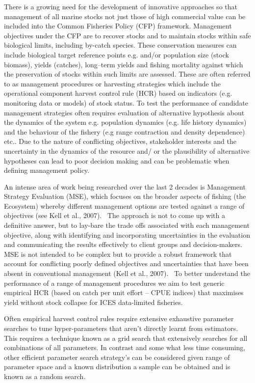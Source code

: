 \documentclass[preprint,12pt]{elsarticle}
\begin{document}
There is a growing need for the development of innovative approaches so that management of all marine stocks not just those of high commercial value can be included into the Common Fisheries Policy (CFP) framework. Management objectives under the CFP are to recover stocks and to maintain stocks within safe biological limits, including by-catch species. These conservation measures can include biological target reference points e.g. and/or population size (stock biomass), yields (catches), long–term yields and fishing mortality against which the preservation of stocks within such limits are assessed. These are often referred to as management procedures or harvesting strategies which include the operational component harvest control rule (HCR) based on indicators (e.g. monitoring data or models) of stock status. To test the performance of candidate management strategies often requires evaluation of alternative hypothesis about the dynamics of the system e.g. population dynamics (e.g. life history dynamics) and the behaviour of the fishery (e.g range contraction and density dependence) etc..  Due to the nature of conflicting objectives, stakeholder interests and the uncertainty in the dynamics of the resource and/ or the plausibility of alternative hypotheses can lead to poor decision making and can be problematic when defining management policy.

An intense area of work being researched over the last 2 decades is Management Strategy Evaluation (MSE), which focuses on the broader aspects of fishing (the Ecosystem) whereby different management options are tested against a range of objectives (see Kell et al., 2007).  The approach is not to come up with a definitive answer, but to lay-bare the trade offs associated with each management objective, along with identifying and incorporating uncertainties in the evaluation and communicating the results effectively to client groups and decision-makers. MSE is not intended to be complex but to provide a robust framework that account for conflicting poorly defined objectives and uncertainties that have been absent in conventional management (Kell et al., 2007).  
To better understand the performance of a range of management procedures we aim to test generic empirical HCR (based on catch per unit effort – CPUE indices) that maximises yield without stock collapse for ICES data-limited fisheries. 

Often empirical harvest control rules require extensive exhaustive parameter searches to tune hyper-parameters that aren’t directly learnt from estimators.  This requires a technique known as a grid search that extensively searches for all combinations of all parameters. In contrast and some what less time consuming, other efficient parameter search strategy’s can be considered given range of parameter space and a known distribution a sample can be obtained and is known as a random search.  
\end{document}
